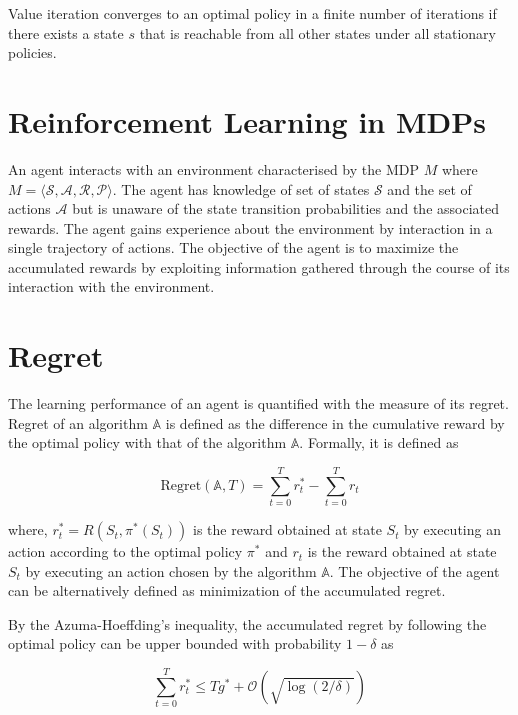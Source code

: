 Value iteration converges to an optimal policy in a finite number of iterations \cite{puterman_chapter_1990} if there exists a state $s$ that is reachable from all other states under all stationary policies.

\section{Reinforcement Learning in MDPs}

An agent interacts with an environment characterised by the MDP $M$ where $M = \langle \mathcal{S}, \mathcal{A}, \mathcal{R}, \mathcal{P} \rangle$.
The agent has knowledge of set of states $\mathcal{S}$ and the set of actions $\mathcal{A}$ but is unaware of the state transition probabilities and the associated rewards.
The agent gains experience about the environment by interaction in a single trajectory of actions.
The objective of the agent is to maximize the accumulated rewards by exploiting information gathered through the course of its interaction with the environment.

\section{Regret}

The learning performance of an agent is quantified with the measure of its regret.
Regret of an algorithm $\mathbb{A}$ is defined as the difference in the cumulative reward by the optimal policy with that of the algorithm $\mathbb{A}$.
Formally, it is defined as

\begin{equation}
    \label{eqn:regret}
    \text{Regret}(\mathbb{A}, T) = \sum_{t = 0}^T r^*_t - \sum_{t = 0}^T r_t 
\end{equation}

where, $r^*_t = R(S_t, \pi^*(S_t))$ is the reward obtained at state $S_t$ by executing an action according to the optimal policy $\pi^*$ and $r_t$ is the reward obtained at state $S_t$ by executing an action chosen by the algorithm $\mathbb{A}$.
The objective of the agent can be alternatively defined as minimization of the accumulated regret.

By the Azuma-Hoeffding's inequality, the accumulated regret by following the optimal policy can be upper bounded with probability $1 - \delta$ as

\begin{equation*}
    \sum_{t = 0}^T r^*_t \le T g^* + \mathcal{O}(\sqrt{\log(2/\delta)}) 
\end{equation*}


